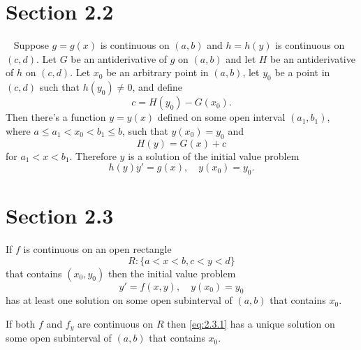 \section*{Section 2.2}
\setcounter{chapter}{2}
\setcounter{section}{2}

\setcounter{theorem}{0}
\setcounter{equation}{9}
\begin{theorem}
  ~\label{thmtype:2.2.1} Suppose $g=g(x)$ is continuous on $(a,b)$ and $h=h(y)$ is continuous on
  $(c,d)$. Let $G$ be an antiderivative of $g$ on $(a,b)$ and let $H$ be an antiderivative of $h$ on
  $(c,d)$. Let $x_{0}$ be an arbitrary point in $(a,b)$, let $y_{0}$ be a point in $(c,d)$ such that
  $h(y_{0})\ne0$, and define
  \begin{equation}
    \label{eq:2.2.10}c=H(y_{0})-G(x_{0}).
  \end{equation}
  Then there's a function $y=y(x)$ defined on some open interval $(a_{1},b_{1})$, where
  $a\le a_{1}<x_{0}<b_{1}\le b$, such that $y(x_{0})=y_{0}$ and
  \begin{equation}
    \label{eq:2.2.11}H(y)=G(x)+c
  \end{equation}
  for $a_{1}<x<b_{1}$. Therefore $y$ is a solution of the initial value problem
  \begin{equation}
    \label{eq:2.2.12}h(y)y'=g(x),\quad y(x_{0})=y_{0}.
  \end{equation}
\end{theorem}

\section*{Section 2.3}
\setcounter{chapter}{2}
\setcounter{section}{3}

\setcounter{theorem}{0}
\setcounter{equation}{0}
\begin{theorem}
  \label{thmtype:2.3.1} \mbox{}
  \newline
  \vspace*{-5pt}
  \begin{alist}
    \item %
    If $f$ is continuous on an open rectangle
    \[
      R:\{a<x<b,c<y<d\}
    \]
    that contains $(x_{0},y_{0})$ then the initial value problem
    \begin{equation}
      \label{eq:2.3.1}y'=f(x,y),\quad y(x_{0})=y_{0}
    \end{equation}
    has at least one solution on some open subinterval of $(a,b)$ that contains $x_{0}$.

    \item %
    If both $f$ and $f_{y}$ are continuous on $R$ then \eqref{eq:2.3.1} has a unique solution on
    some open subinterval of $(a,b)$ that contains $x_{0}$.
  \end{alist}
\end{theorem}

